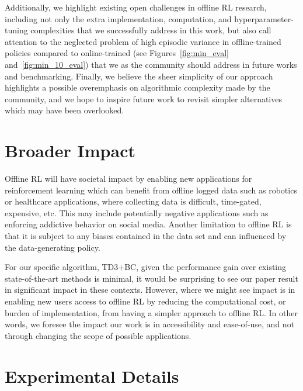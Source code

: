 \documentclass{article}
\begin{document}
Additionally, we highlight existing open challenges in offline RL research, including not only the extra implementation, computation, and hyperparameter-tuning complexities that we successfully address in this work, but also call attention to the neglected problem of high episodic variance in offline-trained policies compared to online-trained (see Figures~\ref{fig:min_eval} and~\ref{fig:min_10_eval}) that we as the community should address in future works and benchmarking. %
Finally, we believe the sheer simplicity of our approach highlights a possible overemphasis on algorithmic complexity made by the community, and we hope to inspire future work to revisit simpler alternatives which may have been overlooked. 
\vfill




















\clearpage
\appendix

\section{Broader Impact}

Offline RL will have societal impact by enabling new applications for reinforcement learning which can benefit from offline logged data such as robotics or healthcare applications, where collecting data is difficult, time-gated, expensive, etc. This may include potentially negative applications such as enforcing addictive behavior on social media. Another limitation to offline RL is that it is subject to any biases contained in the data set and can influenced by the data-generating policy. 

For our specific algorithm, TD3+BC, given the performance gain over existing state-of-the-art methods is minimal, it would be surprising to see our paper result in significant impact in these contexts. However, where we might see impact is in enabling new users access to offline RL by reducing the computational cost, or burden of implementation, from having a simpler approach to offline RL. In other words, we foresee the impact our work is in accessibility and ease-of-use, and not through changing the scope of possible applications.  

\section{Experimental Details}
\end{document}
